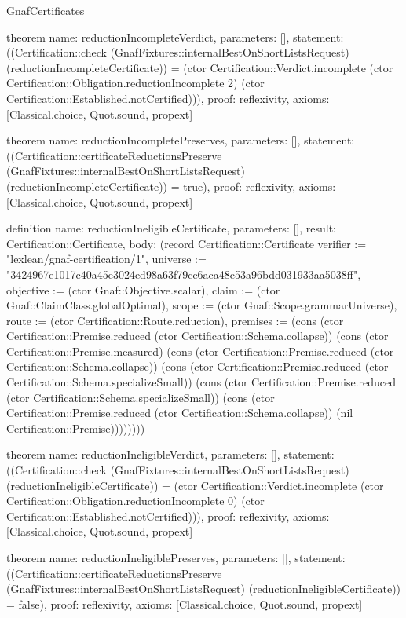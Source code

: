 \begin{lexlean}{GnafCertificates}
\begin{semanticmodule}
theorem{
  name: reductionIncompleteVerdict,
  parameters: [],
  statement: ((Certification::check (GnafFixtures::internalBestOnShortListsRequest) (reductionIncompleteCertificate)) = (ctor Certification::Verdict.incomplete (ctor Certification::Obligation.reductionIncomplete 2) (ctor Certification::Established.notCertified))),
  proof: reflexivity{},
  axioms: [Classical.choice, Quot.sound, propext]
}

theorem{
  name: reductionIncompletePreserves,
  parameters: [],
  statement: ((Certification::certificateReductionsPreserve (GnafFixtures::internalBestOnShortListsRequest) (reductionIncompleteCertificate)) = true),
  proof: reflexivity{},
  axioms: [Classical.choice, Quot.sound, propext]
}

definition{
  name: reductionIneligibleCertificate,
  parameters: [],
  result: Certification::Certificate,
  body: (record Certification::Certificate {verifier := "lexlean/gnaf-certification/1", universe := "3424967e1017c40a45e3024ed98a63f79ce6aca48c53a96bdd031933aa5038ff", objective := (ctor Gnaf::Objective.scalar), claim := (ctor Gnaf::ClaimClass.globalOptimal), scope := (ctor Gnaf::Scope.grammarUniverse), route := (ctor Certification::Route.reduction), premises := (cons (ctor Certification::Premise.reduced (ctor Certification::Schema.collapse)) (cons (ctor Certification::Premise.measured) (cons (ctor Certification::Premise.reduced (ctor Certification::Schema.collapse)) (cons (ctor Certification::Premise.reduced (ctor Certification::Schema.specializeSmall)) (cons (ctor Certification::Premise.reduced (ctor Certification::Schema.specializeSmall)) (cons (ctor Certification::Premise.reduced (ctor Certification::Schema.collapse)) (nil Certification::Premise)))))))})
}

theorem{
  name: reductionIneligibleVerdict,
  parameters: [],
  statement: ((Certification::check (GnafFixtures::internalBestOnShortListsRequest) (reductionIneligibleCertificate)) = (ctor Certification::Verdict.incomplete (ctor Certification::Obligation.reductionIncomplete 0) (ctor Certification::Established.notCertified))),
  proof: reflexivity{},
  axioms: [Classical.choice, Quot.sound, propext]
}

theorem{
  name: reductionIneligiblePreserves,
  parameters: [],
  statement: ((Certification::certificateReductionsPreserve (GnafFixtures::internalBestOnShortListsRequest) (reductionIneligibleCertificate)) = false),
  proof: reflexivity{},
  axioms: [Classical.choice, Quot.sound, propext]
}


\end{semanticmodule}
\end{lexlean}

